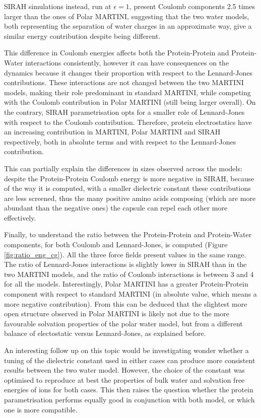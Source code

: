 SIRAH simulations instead, run at $\epsilon = 1$, present Coulomb components 2.5 times larger than the ones of Polar MARTINI, suggesting that the two water models, both representing the separation of water charges in an approximate way, give a similar energy contribution despite being different.

This difference in Coulomb energies affects both the Protein-Protein and Protein-Water interactions consistently, however it can have consequences on the dynamics because it changes their proportion with respect to the Lennard-Jones contributions. These interactions are not changed between the two MARTINI models, making their role predominant in standard MARTINI, while competing with the Coulomb contribution in Polar MARTINI (still being larger overall).
%
On the contrary, SIRAH parametrisation opts for a smaller role of Lennard-Jones with respect to the Coulomb contribution.
%
Therefore, protein electrostatics have an increasing contribution in MARTINI, Polar MARTINI and SIRAH respectively, both in absolute terms and with respect to the Lennard-Jones contribution.

This can partially explain the differences in sizes observed across the models: despite the Protein-Protein Coulomb energy is more negative in SIRAH, because of the way it is computed, with a smaller dielectric constant these contributions are less screened, thus the many positive amino acids composing (which are more abundant than the negative ones) the capsule can repel each other more effectively.

Finally, to understand the ratio between the Protein-Protein and Protein-Water components, for both Coulomb and Lennard-Jones, is computed (Figure \ref{fig:ratio_eng_cg}).
%
All the three force fields present values in the same range.
%
The ratio of Lennard-Jones interactions is slightly lower in SIRAH than in the two MARTINI models, and the ratio of Coulomb interactions is between 3 and 4 for all the models.
%
Interestingly, Polar MARTINI has a greater Protein-Protein component with respect to standard MARTINI (in absolute value, which means a more negative contribution). From this can be deduced that the slightest more open structure observed in Polar MARTINI is likely not due to the more favourable solvation properties of the polar water model, but from a different balance of electostatic versus Lennard-Jones, as explained before.
 
An interesting follow up on this topic would be investigating wonder whether a tuning of the dielectric constant used in either cases can produce more consistent results between the two water model. However, the choice of the constant was optimised to reproduce at best the properties of bulk water and solvation free energies of ions for both cases. This then raises the question whether the protein parametrisation performs equally good in conjunction with both model, or which one is more compatible.


